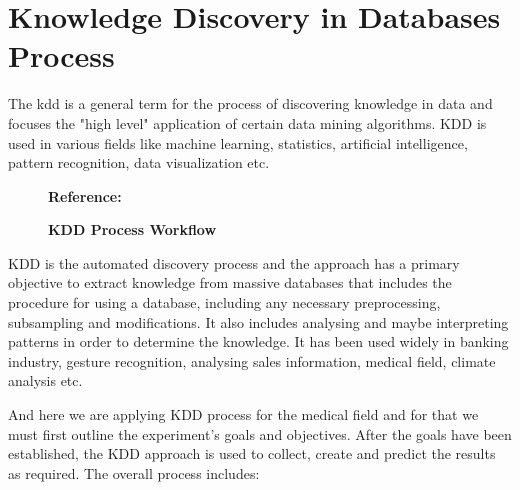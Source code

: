 %
%
%






\chapter{Knowledge Discovery in Databases Process}


The \ac{kdd} is a general term for the process of discovering knowledge in data and focuses the "high level" application of certain data mining algorithms. KDD is used in various fields like machine learning, statistics, artificial intelligence, pattern recognition, data visualization etc. \cite{Fayyad:1996}
\bigskip
 
\begin{figure}
	\centering
	\caption{\textbf{KDD Process Workflow}}
	 \footnotesize \textbf{Reference:}\autocite{Wings:2023}
	\label{fig:KDD}
\end{figure}

KDD is the automated discovery process and the approach has a primary objective to extract knowledge from massive databases that includes the procedure for using a database, including any necessary preprocessing, subsampling and modifications. It also includes analysing and maybe interpreting patterns in order to determine the knowledge. It has been used widely in banking industry, gesture recognition, analysing sales information, medical field, climate analysis etc.\cite{Fayyad:1996}
 \bigskip
 
And here we are applying KDD process for the medical field and for that we must first outline the experiment’s goals and objectives. After the goals have been established, the KDD approach is used to collect, create and predict the results as required. The overall process includes:

